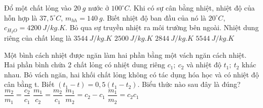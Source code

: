 	\begin{ex}%
		Đổ một chất lỏng vào $20\ g$ nước ở $100^{\circ}C$. Khi có sự cân bằng nhiệt, nhiệt độ của hỗn hợp là $37,5^{\circ}C$, $m_{hh}=140\ g$. Biết nhiệt độ ban đầu của nó là $20^{\circ}C$, $c_{H_2O}=4200\ J/kg.K$. Bỏ qua sự truyền nhiệt ra môi trường bên ngoài. Nhiệt dung riêng của chất lỏng là
		\choice
		{$3544\ J/kg.K$}
		{\True $2500\ J/kg.K$}
		{$2844\ J/kg.K$}
		{$5544\ J/kg.K$}
		\end{ex}
	
	
	\begin{ex} 
		Một bình cách nhiệt được ngăn làm hai phần bằng một vách ngăn cách nhiệt. Hai phần bình chứa 2 chất lỏng có nhiệt dung riêng $c_1;\ c_2$ và nhiệt độ $t_1;\ t_2$ khác nhau. Bỏ vách ngăn, hai khối chất lỏng không có tác dụng hóa học và có nhiệt độ cân bằng t.
		Biết $\left(t_1-t\right)=0,5\left(t_1-t_2\right)$. Biểu thức nào sau đây là đúng?
		\choice
		{$\dfrac{m_2}{m_1}=\dfrac{c_2}{c_1}$}
		{\True $\dfrac{m_1}{c_2}=\dfrac{m_2}{c_1}$}
		{$\dfrac{m_1}{m_2}=c_2-c_1$}
		{$\dfrac{m_1}{m_2}=c_2c_1$}
	\end{ex}
		
